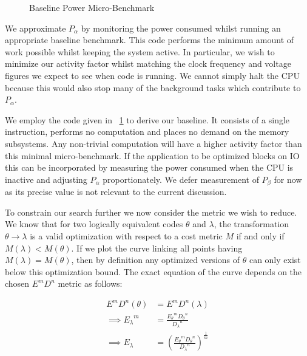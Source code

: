\begin{figure}[ht]                                                               
\centering                                                                      
\lstset{basicstyle=\ttfamily\footnotesize\bfseries,                             
      frame=tb}                                                                 
                             
\caption{Baseline Power Micro-Benchmark}                            
\label{fig:microbench}                                                           
\end{figure}  

We approximate $P_{\alpha}$ by monitoring the power consumed whilst running an appropriate baseline benchmark. This code performs the minimum amount of work possible whilst keeping the system active. In particular, we wish to minimize our activity factor whilst matching the clock frequency and voltage figures we expect to see when code is running. We cannot simply halt the CPU because this would also stop many of the background tasks which contribute to $P_{\alpha}$.

We employ the code given in \figurename~\ref{fig:microbench} to derive our baseline.  It consists of a single instruction, performs no computation and places no demand on the memory subsystems. Any non-trivial computation will have a higher activity factor than this minimal micro-benchmark. If the application to be optimized blocks on IO this can be incorporated by measuring the power consumed when the CPU is inactive and adjusting $P_\alpha$ proportionately. We defer measurement of $P_{\beta}$ for now as its precise value is not relevant to the current discussion. 

To constrain our search further we now consider the metric we wish to reduce. We know that for two logically equivalent codes $\theta$ and $\lambda$, the transformation $\theta \to \lambda$ is a valid optimization with respect to a cost metric $M$ if and only if $M(\lambda) < M(\theta)$. If we plot the curve linking all points having $M(\lambda) = M(\theta)$, then by definition any optimized versions of $\theta$ can only exist below this optimization bound. The exact equation of the curve depends on the chosen $E^mD^n$ metric as follows:

\begin{align}
E^mD^n(\theta) &= E^mD^n(\lambda) \nonumber \\
\implies {E_\lambda}^m &= \frac{{E_\theta}^m{D_\theta}^n}{{D_\lambda}^n} \nonumber \\
\implies E_\lambda &= (\frac{{E_\theta}^m{D_\theta}^n}{{D_\lambda}^n})^\frac{1}{m}
\end{align}

